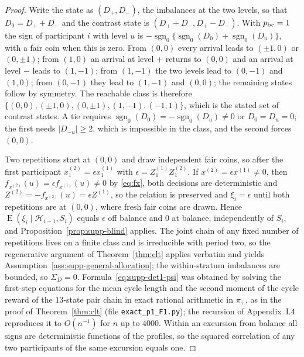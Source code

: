 \documentclass[12pt,a4paper]{article}
\theoremstyle{definition}
\theoremstyle{remark}\newtheorem{remark}{Remark}
\numberwithin{equation}{section}
\newcommand{\E}{\operatorname{E}}
\newcommand{\sg}{\operatorname{sgn}_0}
\begin{document}
\begin{proof}
Write the state as $(D_+,D_-)$, the imbalances at the two levels, so that $D_0=D_++D_-$ and the contrast state is $(D_++D_-,D_+-D_-)$. With $p_{\rm bc}=1$ the sign of participant $i$ with level $u$ is $-\sg\{\sg(D_0)+\sg(D_u)\}$, with a fair coin when this is zero. From $(0,0)$ every arrival leads to $(\pm1,0)$ or $(0,\pm1)$; from $(1,0)$ an arrival at level $+$ returns to $(0,0)$ and an arrival at level $-$ leads to $(1,-1)$; from $(1,-1)$ the two levels lead to $(0,-1)$ and $(1,0)$; from $(0,-1)$ they lead to $(1,-1)$ and $(0,0)$; the remaining states follow by symmetry. The reachable class is therefore $\{(0,0),(\pm1,0),(0,\pm1),(1,-1),(-1,1)\}$, which is the stated set of contrast states. A tie requires $\sg(D_0)=-\sg(D_u)\ne0$ or $D_0=D_u=0$; the first needs $|D_{-u}|\ge2$, which is impossible in the class, and the second forces $(0,0)$.

Two repetitions start at $(0,0)$ and draw independent fair coins, so after the first participant $x^{(2)}_1=\epsilon x^{(1)}_1$ with $\epsilon=Z^{(1)}_1Z^{(2)}_1$. If $x^{(2)}=\epsilon x^{(1)}\ne0$, then $f_{x^{(2)}}(u)=\epsilon f_{x^{(1)}}(u)\ne0$ by \eqref{eq:fx}, both decisions are deterministic and $Z^{(2)}=-f_{x^{(2)}}(u)=\epsilon Z^{(1)}$, so the relation is preserved and $\xi_i=\epsilon$ until both repetitions are at $(0,0)$, where fresh fair coins are drawn. Hence $\E(\xi_i\mid\mathcal H_{i-1},S_i)$ equals $\epsilon$ off balance and $0$ at balance, independently of $S_i$, and Proposition~\ref{prop:supp-blind} applies. The joint chain of any fixed number of repetitions lives on a finite class and is irreducible with period two, so the regenerative argument of Theorem~\ref{thm:clt} applies verbatim and yields Assumption~\ref{ass:supp-general-allocation}; the within-stratum imbalances are bounded, so $\Sigma_D=0$. Formula~\eqref{eq:supp-det1-psi} was obtained by solving the first-step equations for the mean cycle length and the second moment of the cycle reward of the $13$-state pair chain in exact rational arithmetic in $\pi_+$, as in the proof of Theorem~\ref{thm:clt} (file \texttt{exact\_p1\_F1.py}); the recursion of Appendix~I.4 reproduces it to $O(n^{-1})$ for $n$ up to $4000$. Within an excursion from balance all signs are deterministic functions of the profiles, so the squared correlation of any two participants of the same excursion equals one.
\end{proof}
\end{document}
